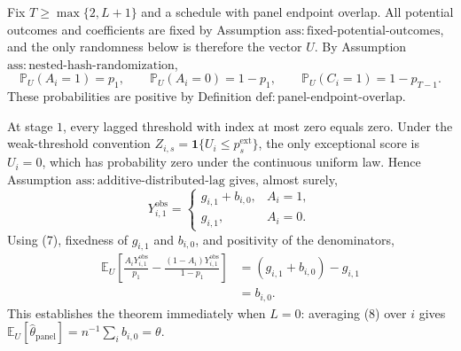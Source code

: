 Fix \(T\ge\max\{2,L+1\}\) and a schedule with panel endpoint overlap.  All potential outcomes and coefficients are fixed by Assumption \(\mathrm{ass:fixed\text{-}potential\text{-}outcomes}\), and the only randomness below is therefore the vector \(U\).  By Assumption \(\mathrm{ass:nested\text{-}hash\text{-}randomization}\),
\[
 \mathbb P_U(A_i=1)=p_1,
 \qquad
 \mathbb P_U(A_i=0)=1-p_1,
 \qquad
 \mathbb P_U(C_i=1)=1-p_{T-1}.
 \tag{7}
\]
These probabilities are positive by Definition \(\mathrm{def:panel\text{-}endpoint\text{-}overlap}\).

At stage \(1\), every lagged threshold with index at most zero equals zero.  Under the weak-threshold convention \(Z_{i,s}=\mathbf 1\{U_i\le p_s^{\mathrm{ext}}\}\), the only exceptional score is \(U_i=0\), which has probability zero under the continuous uniform law.  Hence Assumption \(\mathrm{ass:additive\text{-}distributed\text{-}lag}\) gives, almost surely,
\[
 Y^{\mathrm{obs}}_{i,1}
 =\begin{cases}
 g_{i,1}+b_{i,0},&A_i=1,\\
 g_{i,1},&A_i=0.
 \end{cases}
\]
Using (7), fixedness of \(g_{i,1}\) and \(b_{i,0}\), and positivity of the denominators,
\[
\begin{aligned}
 \mathbb E_U\left[
 \frac{A_iY^{\mathrm{obs}}_{i,1}}{p_1}
 -\frac{(1-A_i)Y^{\mathrm{obs}}_{i,1}}{1-p_1}
 \right]
 &=(g_{i,1}+b_{i,0})-g_{i,1}\\
 &=b_{i,0}.
\end{aligned}
\tag{8}
\]
This establishes the theorem immediately when \(L=0\): averaging (8) over \(i\) gives \(\mathbb E_U[\widehat\theta_{\mathrm{panel}}]=n^{-1}\sum_i b_{i,0}=\theta\).

